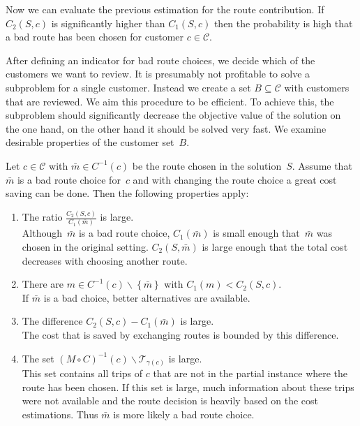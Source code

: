 Now we can evaluate the previous estimation for the route contribution. If $C_2(S,c)$ is significantly higher than $C_1(S,c)$ then the probability is high that a bad route has been chosen for customer $c\in\mathcal{C}$.

After defining an indicator for bad route choices, we decide which of the customers we want to review. It is presumably not profitable to solve a subproblem for a single customer. Instead we create a set ${B\subseteq\mathcal{C}}$ with customers that are reviewed. We aim this procedure to be efficient. To achieve this, the subproblem should significantly decrease the objective value of the solution on the one hand, on the other hand it should be solved very fast. We examine desirable properties of the customer set~$B$.

Let ${c\in\mathcal{C}}$ with ${\bar{m}\in C^{-1}(c)}$ be the route chosen in the solution~$S$. Assume that~$\bar{m}$ is a bad route choice for~$c$ and with changing the route choice a great cost saving can be done. Then the following properties apply:
\begin{enumerate}
	\item The ratio $\frac{C_2(S,c)}{C_1\left(\bar{m}\right)}$ is large. \\
	Although~$\bar{m}$ is a bad route choice, $C_1\left(\bar{m}\right)$ is small enough that~$\bar{m}$ was chosen in the original setting. $C_2\left(S,\bar{m}\right)$ is large enough that the total cost decreases with choosing another route.
	\item There are ${m\in C^{-1}(c)\backslash\left\{\bar{m}\right\}}$ with ${C_1(m)<C_2(S,c)}$. \\
	If $\bar{m}$ is a bad choice, better alternatives are available.
	\item The difference ${C_2(S,c) - C_1\left(\bar{m}\right)}$ is large. \\
	The cost that is saved by exchanging routes is bounded by this difference.
	\item The set ${(M\circ C)^{-1}(c)\backslash\mathcal{T}_{\gamma(c)}}$ is large. \\
	This set contains all trips of $c$ that are not in the partial instance where the route has been chosen. If this set is large, much information about these trips were not available and the route decision is heavily based on the cost estimations. Thus $\bar{m}$ is more likely a bad route choice.
\end{enumerate}

